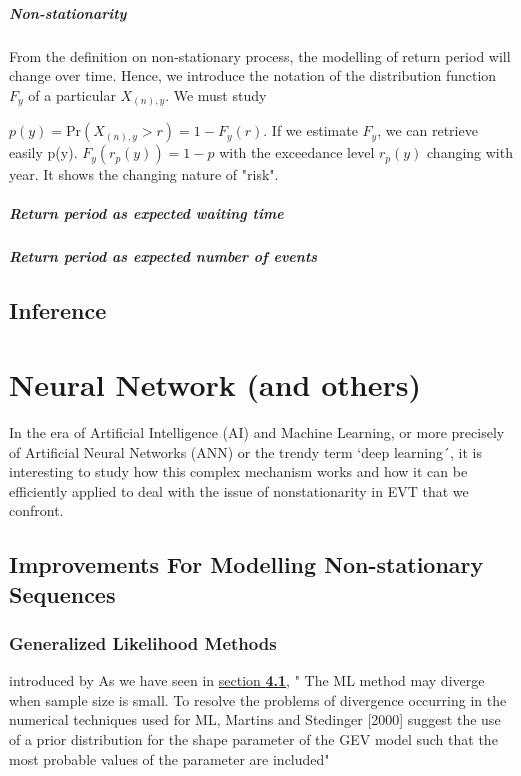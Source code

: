 \documentclass[11pt,a4paper,openany ]{book}
\begin{document}
\paragraph*{Non-stationarity}

From the definition on non-stationary process, the modelling of return period will change over time.
Hence, we introduce the notation of the distribution function $F_y$ of a particular $X_{(n),y}$. We must study 

$p(y)=\text{Pr}(X_{(n),y}>r)=1-F_y(r)$. If we estimate $F_y$, we can retrieve easily p(y).
$F_y(r_p(y))=1-p$ with the exceedance level $r_p(y)$ changing with year. It shows the changing nature of "risk".

\paragraph*{Return period as expected waiting time}

\paragraph*{Return period as expected number of events}

\section{Inference}


\chapter{Neural Network (and others) }
\vspace{-1cm}
\minitoc\thispagestyle{empty}

In the era of Artificial Intelligence (AI) and Machine Learning, or more precisely of Artificial Neural Networks (ANN) or the trendy term `deep learning´, it is interesting to study how this complex mechanism works and how it can be efficiently applied to deal with the issue of nonstationarity in EVT that we confront.



\section{Improvements For Modelling Non-stationary Sequences}\label{improvinf}
\subsection{Generalized Likelihood Methods}
introduced by \citet{martin_generalized_2000}
As we have seen in \hyperref[likintro]{section \textbf{4.1}}, 
" The ML method may diverge
when sample size is small. To resolve the problems of
divergence occurring in the numerical techniques used for
ML, Martins and Stedinger [2000] suggest the use of a prior
distribution for the shape parameter of the GEV model such
that the most probable values of the parameter are included"
\end{document}
